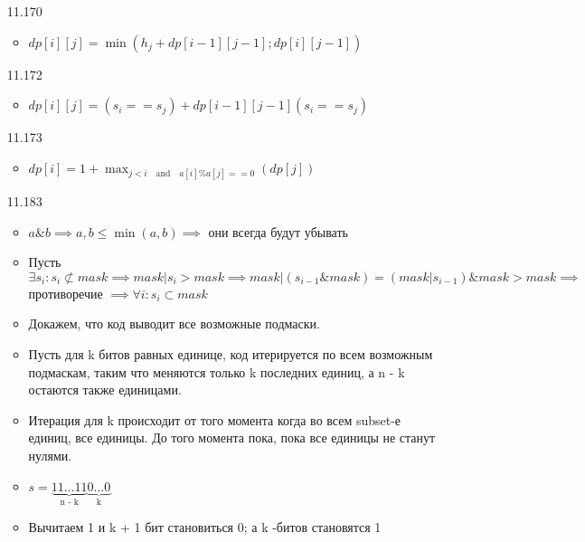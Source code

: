 \documentclass{article}
\author{Бугрий Илья M3134}
\date{November 2023}
\begin{document}
\begin{enumerate}
    \item [11.170]\phantom{k} \\
    \begin{itemize}
        \item $dp[i][j] = \min (h_j + dp[i - 1][j - 1]; dp[i][j - 1])$
    \end{itemize}

    \item [11.172]\phantom{k} \\
    \begin{itemize}
        \item $dp[i][j] = (s_i == s_j) + dp[i-1][j-1](s_i == s_j)$
    \end{itemize}

    \item [11.173] \phantom{k} \\
    \begin{itemize}
        \item $dp[i] = 1 + \max_{j < i \quad\text{and} \quad a[i] \%  a[j] == 0}(dp[j])$
    \end{itemize}

    \item [11.183] \phantom{k} \\
    \begin{itemize}
        \item $a \& b \implies a, b \leq \min (a, b) \implies$ они всегда будут убывать
        \item Пусть $\exists s_i: s_i \not\subset mask \implies mask | s_i > mask \implies mask | (s_{i-1} \& mask) = (mask | s_{i-1}) \& mask > mask \implies$ 
        противоречие  $\implies \forall i: s_i \subset mask$
        \item Докажем, что код выводит все возможные подмаски.
        \item Пусть для k битов равных единице, код итерируется по всем возможным подмаскам, таким что 
        меняются только k последних единиц, а n - k остаются также единицами.
        \item Итерация для k происходит от того момента когда во всем subset-е единиц, все единицы. 
        До того момента пока, пока все единицы не станут нулями.
        \item$s = \underbrace{11\dots11}_\text{n - k}\underbrace{0\dots0}_\text{k}$  
        \item Вычитаем 1 и k + 1 бит становиться 0; а k -битов становятся 1
    \end{itemize}


\end{enumerate}
\end{document}
